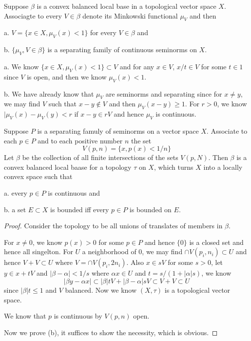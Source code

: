 \begin{theorem}
    Suppose $\beta$ is a convex balanced local base in a topological vector space $X$. Associagte to every $V\in\beta$ denote its Minkowski functional $\mu_V$ and then\par
    a. $V = \{x\in X, \mu_V(x) < 1\}$ for every $V\in\beta$ and\par
    b. $\{\mu_V, V\in\beta\}$ is a separating family of continuous seminorms on $X$.
\end{theorem}
\begin{theorem}
    a. We know $\{x\in X, \mu_V(x) < 1\} \subset V$ and for any $x\in V$, $x/t \in V$ for some $t\in 1$ since $V$ is open, and then we know $\mu_V(x) < 1$.\par
    b. We have already know that $\mu_V$ are seminorms and separating since for $x\neq y$, we may find $V$ such that $x-y \notin V$ and then $\mu_V(x-y) \geq 1$. For $r>0$, we know $|\mu_V(x)-\mu_V(y) < r$ if $x-y \in rV$ and hence $\mu_V$ is continuous.
\end{theorem}

\begin{theorem}
    Suppose $P$ is a separating famuly of seminorms on a vector space $X$. Associate to each $p\in P$ and to each positive number $n$ the set
    \[V(p,n) = \{x, p(x)<1/n\}\]
    Let $\beta$ be the collection of all finite intersections of the sets $V(p,N)$. Then $\beta$ is a convex balanced local baase for a topology $\tau$ on $X$, which turns $X$ into a locally convex space such that\par
    a. every $p\in P$ is continuous and\par
    b. a set $E\subset X$ is bounded iff every $p\in P$ is bounded on $E$.
\end{theorem}
\begin{proof}
    Consider the topology to be all unions of translates of members in $\beta$.\par
    For $x\neq 0$, we know $p(x) > 0$ for some $p\in P$ and hence $\{0\}$ is a closed set and hence all singelton. For $U$ a neighborhood of $0$, we may find $\cap V(p_i,n_i) \subset U$ and hence $V+V\subset U$ where $V = \cap V(p_i,2n_i)$. Also $x\in sV$ for some $s>0$, let $y\in x+tV$ and $|\beta -\alpha| < 1/s$ where $\alpha x\in U$ and $t = s/(1+|\alpha| s)$, we know
    \[
    |\beta y - \alpha x| \subset |\beta|tV + |\beta-\alpha|sV \subset V+V\subset U
    \] 
    since $|\beta|t\leq 1$ and $V$ balanced. Now we know $(X,\tau)$ is a topological vector space.\par
    We know that $p$ is continuous by $V(p,n)$ open.\par
    Now we prove (b), it suffices to show the necessity, which is obvious.
\end{proof}

